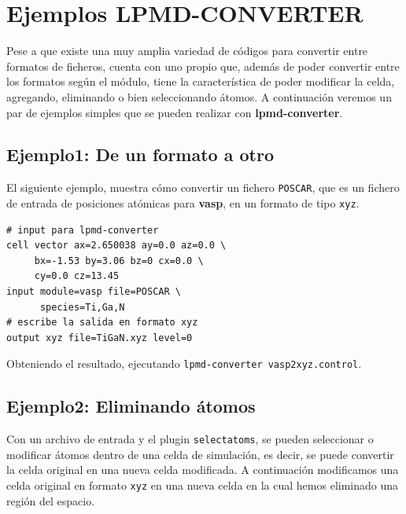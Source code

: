 \section{Ejemplos LPMD-CONVERTER}

Pese a que existe una muy amplia variedad de c\'odigos para convertir entre formatos de ficheros, {\lpmd} cuenta con uno propio que, adem\'as de poder convertir entre los formatos seg\'un el m\'odulo, tiene la caracter\'istica de poder modificar la celda, agregando, eliminando o bien seleccionando \'atomos. A continuaci\'on veremos un par de ejemplos simples que se pueden realizar con \textbf{lpmd-converter}.

\subsection{Ejemplo1: De un formato a otro}

El siguiente ejemplo, muestra c\'omo convertir un fichero \verb|POSCAR|, que es un fichero de entrada de posiciones at\'omicas para \textbf{vasp}, en un formato de tipo \verb|xyz|.

\begin{multicols}{2}
\setlength{\columnseprule}{.5pt}
\begin{verbatim}
# input para lpmd-converter
cell vector ax=2.650038 ay=0.0 az=0.0 \
     bx=-1.53 by=3.06 bz=0 cx=0.0 \
     cy=0.0 cz=13.45
input module=vasp file=POSCAR \
      species=Ti,Ga,N
# escribe la salida en formato xyz
output xyz file=TiGaN.xyz level=0
\end{verbatim}
\end{multicols}

Obteniendo el resultado, ejecutando \verb|lpmd-converter vasp2xyz.control|.
% 

\subsection{Ejemplo2: Eliminando \'atomos}

Con un archivo de entrada y el plugin \verb|selectatoms|, se pueden seleccionar o modificar \'atomos dentro de una celda de simulaci\'on, es decir, se puede convertir la celda original en una nueva celda modificada. A continuaci\'on modificamos una celda original en formato \verb|xyz| en una nueva celda en la cual hemos eliminado una regi\'on del espacio.

